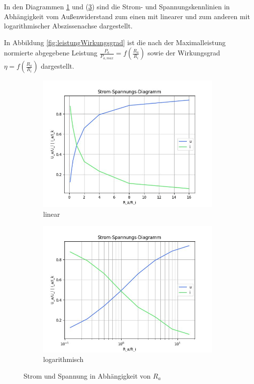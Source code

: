 In den Diagrammen \ref{fig:stromSpannungsKennlinieNormal} und (\ref{fig:leistungWirkungsgradLogarithmisch}) sind die Strom- und Spannungskennlinien in Abhängigkeit vom Außenwiderstand zum einen mit linearer und zum anderen mit logarithmischer Abszissenachse dargestellt.

In Abbildung \ref{fig:leistungWirkungsgrad} ist die nach der Maximalleistung normierte abgegebene Leistung $\frac{P_a}{P_{a,max}}=f\left(\frac{R_a}{R_i}\right)$ sowie der Wirkungsgrad $\eta=f\left(\frac{R_a}{R_i}\right)$ dargestellt.

\begin{figure}[ht]
    \begin{subfigure}[h]{0.5\linewidth}
        \includegraphics[width=\linewidth]{Bilder/StromSpannungLinear.jpeg}
        \caption{linear}
        \label{fig:stromSpannungsKennlinieNormal}
    \end{subfigure}
    \hfill
    \begin{subfigure}[h]{0.5\linewidth}
        \includegraphics[width=\linewidth]{Bilder/StromSpannungLogarithmisch.jpeg}
        \caption{logarithmisch}
        \label{fig:leistungWirkungsgradLogarithmisch}
    \end{subfigure}
    \caption{Strom und Spannung in Abhängigkeit von $R_a$}
\end{figure}

